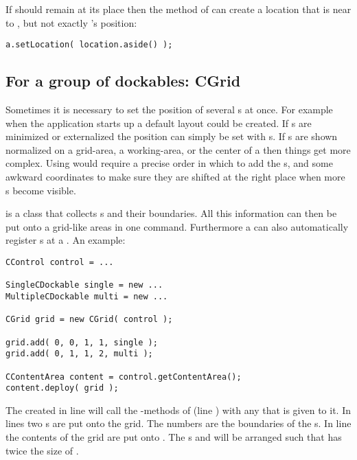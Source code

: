If  should remain at its place then the method  of  can create a location that is near to , but not exactly 's position:
\begin{lstlisting}[firstnumber=5]
a.setLocation( location.aside() );
\end{lstlisting}



\subsection{For a group of dockables: CGrid}
Sometimes it is necessary to set the position of several s at once. For example when the application starts up a default layout could be created. If s are minimized or externalized the position can simply be set with s. If s are shown normalized on a grid-area, a working-area, or the center of a  then things get more complex. Using  would require a precise order in which to add the s, and some awkward coordinates to make sure they are shifted at the right place when more s become visible.

 is a class that collects s and their boundaries. All this information can then be put onto a grid-like areas in one command. Furthermore a  can also automatically register s at a . An example:
\begin{lstlisting}
CControl control = ...

SingleCDockable single = new ...
MultipleCDockable multi = new ...

CGrid grid = new CGrid( control );

grid.add( 0, 0, 1, 1, single );
grid.add( 0, 1, 1, 2, multi );

CContentArea content = control.getContentArea();
content.deploy( grid );
\end{lstlisting}
The  created in line  will call the -methods of  (line ) with any  that is given to it. In lines  two s are put onto the grid. The numbers are the boundaries of the s. In line  the contents of the grid are put onto . The s  and  will be arranged such that  has twice the size of .

